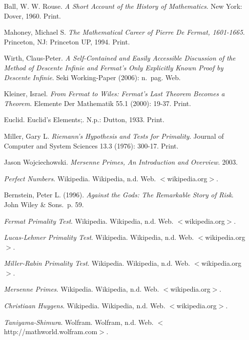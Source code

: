 \documentclass[11pt]{article}
\begin{document}
\begin{thebibliography}{9}
    Ball, W. W. Rouse. \emph{A Short Account of the History of Mathematics}. New York: Dover, 1960. Print.

    Mahoney, Michael S. \emph{The Mathematical Career of Pierre De Fermat, 1601-1665}. Princeton, NJ: Princeton UP, 1994. Print.

    Wirth, Claus-Peter.
    \emph{A Self-Contained and Easily Accessible Discussion of the Method of Descente Infinie and Fermat's Only Explicitly Known Proof by Descente Infinie}.
    Seki Working-Paper (2006): n.\ pag. Web.

    Kleiner, Israel.
    \emph{From Fermat to Wiles: Fermat's Last Theorem Becomes a Theorem}.
    Elemente Der Mathematik 55.1 (2000): 19-37. Print.

    Euclid. Euclid's Elements;. N.p.: Dutton, 1933. Print.

    Miller, Gary L.
    \emph{Riemann's Hypothesis and Tests for Primality}.
    Journal of Computer and System Sciences 13.3 (1976): 300-17. Print.

    Jason Wojciechowski.
    \emph{Mersenne Primes, An Introduction and Overview}. 2003.


    \emph{Perfect Numbers}. Wikipedia. Wikipedia, n.d. Web. $<$wikipedia.org$>$.

    Bernstein, Peter L. (1996).
    \emph{Against the Gods: The Remarkable Story of Risk}. John Wiley \& Sons.\ p. 59.


    \emph{Fermat Primality Test}. Wikipedia. Wikipedia, n.d. Web. $<$wikipedia.org$>$.

    \emph{Lucas-Lehmer Primality Test}.  Wikipedia. Wikipedia, n.d. Web. $<$wikipedia.org$>$.

    \emph{Miller-Rabin Primality Test}.  Wikipedia. Wikipedia, n.d. Web. $<$wikipedia.org$>$.

    \emph{Mersenne Primes}. Wikipedia. Wikipedia, n.d. Web. $<$wikipedia.org$>$.

    \emph{Christiaan Huygens}. Wikipedia. Wikipedia, n.d. Web. $<$wikipedia.org$>$.

    \emph{Taniyama-Shimura}. Wolfram. Wolfram, n.d. Web. $<$http://mathworld.wolfram.com$>$.
\end{thebibliography}
\end{document}
